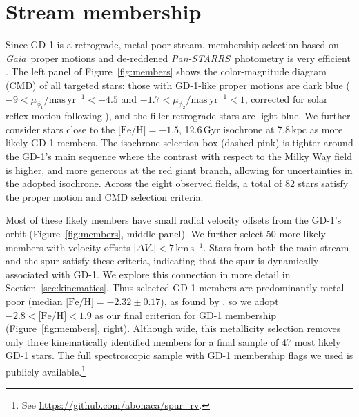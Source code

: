 \documentclass[twocolumn]{aastex63}
\newcommand{\gaia}{\textsl{Gaia}}
\newcommand{\pans}{\textsl{Pan-STARRS}}
\newcommand{\kms}{\ensuremath{\textrm{km}\,\textrm{s}^{-1}}}
\newcommand{\masyr}{\ensuremath{\textrm{mas}\,\textrm{yr}^{-1}}}
\newcommand{\feh}{\ensuremath{\textrm{[Fe/H]}}}
\begin{document}
\section{Stream membership}
\label{sec:membership}

Since GD-1 is a retrograde, metal-poor stream, membership selection based on \gaia\ proper motions \citep{gdr2} and de-reddened \pans\ photometry \citep{sfd, ps1} is very efficient \citep[e.g.,][]{pwb}.
The left panel of Figure~\ref{fig:members} shows the color-magnitude diagram (CMD) of all targeted stars: those with GD-1-like proper motions are dark blue ($-9<\mu_{\phi_1}/\masyr<-4.5$ and $-1.7<\mu_{\phi_2}/\masyr<1$, corrected for solar reflex motion following \citealt{pwb}), and the filler retrograde stars are light blue.
We further consider stars close to the $\textrm{[Fe/H]}=-1.5$, 12.6\,Gyr isochrone at 7.8\,kpc \citep{choi2016} as more likely GD-1 members.
The isochrone selection box (dashed pink) is tighter around the GD-1's main sequence where the contrast with respect to the Milky Way field is higher, and more generous at the red giant branch, allowing for uncertainties in the adopted isochrone.
Across the eight observed fields, a total of 82 stars satisfy the proper motion and CMD selection criteria.

Most of these likely members have small radial velocity offsets from the GD-1's orbit (Figure~\ref{fig:members}, middle panel).
We further select 50 more-likely members with velocity offsets $|\Delta V_r| < 7\,\kms$.
Stars from both the main stream and the spur satisfy these criteria, indicating that the spur is dynamically associated with GD-1.
We explore this connection in more detail in Section~\ref{sec:kinematics}.
Thus selected GD-1 members are predominantly metal-poor (median $\feh=-2.32\pm0.17$), as found by \citet{malhan2019}, so we adopt $-2.8<\feh<1.9$ as our final criterion for GD-1 membership (Figure~\ref{fig:members}, right).
Although wide, this metallicity selection removes only three kinematically identified members for a final sample of 47 most likely GD-1 stars.
The full spectroscopic sample with GD-1 membership flags we used is publicly available.\footnote{See \url{https://github.com/abonaca/spur_rv}.}
\end{document}
